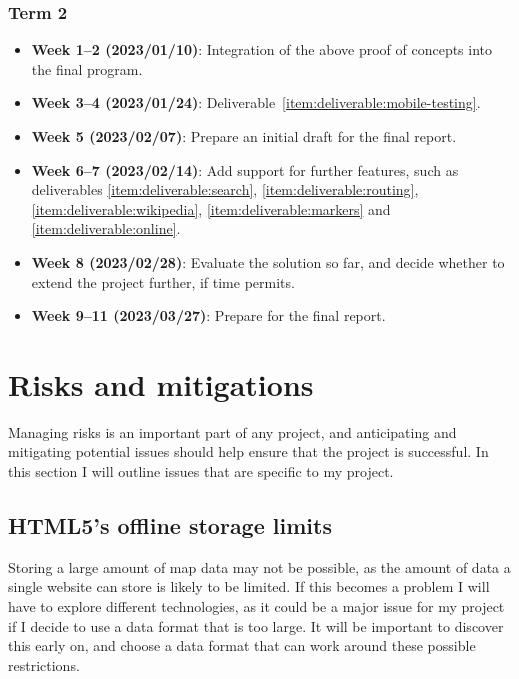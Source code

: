 \documentclass[]{final_report}
\begin{document}
\subsection{Term 2}

\begin{itemize}
    \item \textbf{Week 1--2 (2023/01/10)}: Integration of the above proof of concepts into the final program.
    \item \textbf{Week 3--4 (2023/01/24)}: Deliverable~\ref{item:deliverable:mobile-testing}.
    \item \textbf{Week 5 (2023/02/07)}: Prepare an initial draft for the final report.
    \item \textbf{Week 6--7 (2023/02/14)}: Add support for further features, such as deliverables \ref{item:deliverable:search}, \ref{item:deliverable:routing}, \ref{item:deliverable:wikipedia}, \ref{item:deliverable:markers} and \ref{item:deliverable:online}.
    \item \textbf{Week 8 (2023/02/28)}: Evaluate the solution so far, and decide whether to extend the project further, if time permits.
    \item \textbf{Week 9--11 (2023/03/27)}: Prepare for the final report.
\end{itemize}


\chapter{Risks and mitigations}

Managing risks is an important part of any project, and anticipating and mitigating potential issues should help ensure that the project is successful. In this section I will outline issues that are specific to my project.

\section{HTML5's offline storage limits}\label{sec:html5-storage-limits}

Storing a large amount of map data may not be possible, as the amount of data a single website can store is likely to be limited. If this becomes a problem I will have to explore different technologies, as it could be a major issue for my project if I decide to use a data format that is too large. It will be important to discover this early on, and choose a data format that can work around these possible restrictions.
\end{document}
